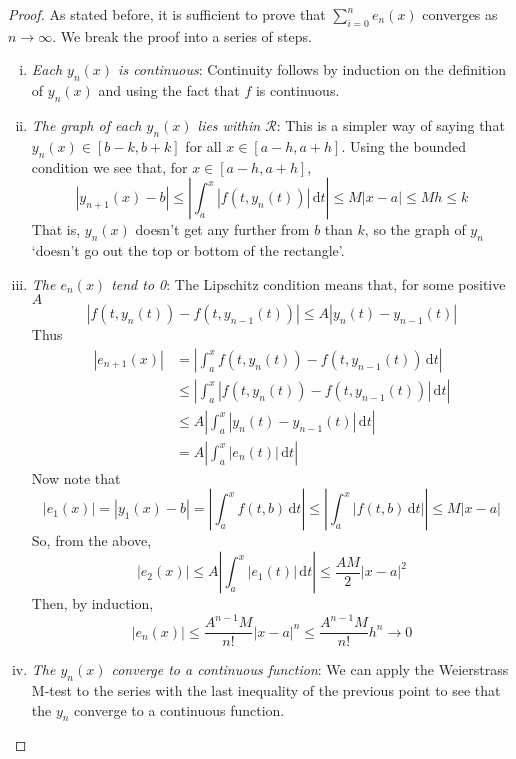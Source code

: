 \documentclass[10pt,fleqn]{article}
\newcommand{\diff}{\,\mathrm{d}}
\newcommand{\rect}{\mathcal{R}}
\theoremstyle{definition} \newtheorem{defn}{Definition}[section]
\theoremstyle{plain}      \newtheorem{thm}[defn]{Theorem}
\theoremstyle{plain}      \newtheorem{lem}[defn]{Lemma}
\theoremstyle{definition} \newtheorem{prop}[defn]{Proposition}
\theoremstyle{definition} \newtheorem{cor}[defn]{Corollary}
\theoremstyle{definition} \newtheorem{ex}[defn]{Example}
\theoremstyle{definition} \newtheorem{rem}[defn]{Remark}
\begin{document}
\begin{proof}
    As stated before, it is sufficient to prove that $\sum_{i=0}^n e_n(x)$ converges as $n\to\infty$.
    We break the proof into a series of steps.
    \begin{enumerate}[(i)]
        \item \emph{Each $y_n(x)$ is continuous}:
        Continuity follows by induction on the definition of $y_n(x)$ and using the fact that $f$ is continuous.
        \item \emph{The graph of each $y_n(x)$ lies within $\rect$}:
        This is a simpler way of saying that $y_n(x)\in[b-k,b+k]$ for all $x\in[a-h,a+h]$.
        Using the bounded condition we see that, for $x\in[a-h,a+h]$,
        \[
            |y_{n+1}(x)-b|\leq
            \left|\int_a^x|f(t,y_n(t))|\diff t\right|\leq
            M|x-a|\leq
            Mh\leq
            k
        \]
        That is, $y_n(x)$ doesn't get any further from $b$ than $k$, so the graph of $y_n$ `doesn't go out the top or bottom of the rectangle'.
        \item \emph{The $e_n(x)$ tend to 0}:
        The Lipschitz condition means that, for some positive $A$
        \[
            |f(t,y_n(t))-f(t,y_{n-1}(t))|\leq
            A|y_n(t)-y_{n-1}(t)|
        \]
        Thus
        \begin{align*}
            |e_{n+1}(x)|
            &=
            \left|\int_a^x f(t,y_n(t))-f(t,y_{n-1}(t))\diff t\right|\\
            &\leq
            \left|\int_a^x |f(t,y_n(t))-f(t,y_{n-1}(t))|\diff t\right|\\
            &\leq
            A\left|\int_a^x |y_n(t)-y_{n-1}(t)|\diff t\right|\\
            &=
            A\left|\int_a^x |e_n(t)|\diff t\right|
        \end{align*}
        Now note that
        \[
            |e_1(x)|=
            |y_1(x)-b|=
            \left|\int_a^x f(t,b)\diff t\right|\leq
            \left|\int_a^x |f(t,b)\diff t|\right|\leq
            M|x-a|
        \]
        So, from the above,
        \[
            |e_2(x)|\leq
            A\left|\int_a^x |e_1(t)|\diff t\right|\leq
            \frac{AM}{2}|x-a|^2
        \]
        Then, by induction,
        \[
            |e_n(x)|\leq
            \frac{A^{n-1}M}{n!}|x-a|^n\leq
            \frac{A^{n-1}M}{n!}h^n\to0
        \]
        \item \emph{The $y_n(x)$ converge to a continuous function}:
        We can apply the Weierstrass M-test to the series with the last inequality of the previous point to see that the $y_n$ converge to a continuous function.

\end{enumerate}
\end{proof}
\end{document}
